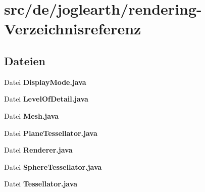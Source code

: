 \section{src/de/joglearth/rendering-\/\-Verzeichnisreferenz}
\label{dir_d59a6d369409d216d7501eca6684a691}
\subsection*{Dateien}
\begin{DoxyCompactItemize}
\item 
Datei {\bfseries Display\-Mode.\-java}
\item 
Datei {\bfseries Level\-Of\-Detail.\-java}
\item 
Datei {\bfseries Mesh.\-java}
\item 
Datei {\bfseries Plane\-Tessellator.\-java}
\item 
Datei {\bfseries Renderer.\-java}
\item 
Datei {\bfseries Sphere\-Tessellator.\-java}
\item 
Datei {\bfseries Tessellator.\-java}
\end{DoxyCompactItemize}
